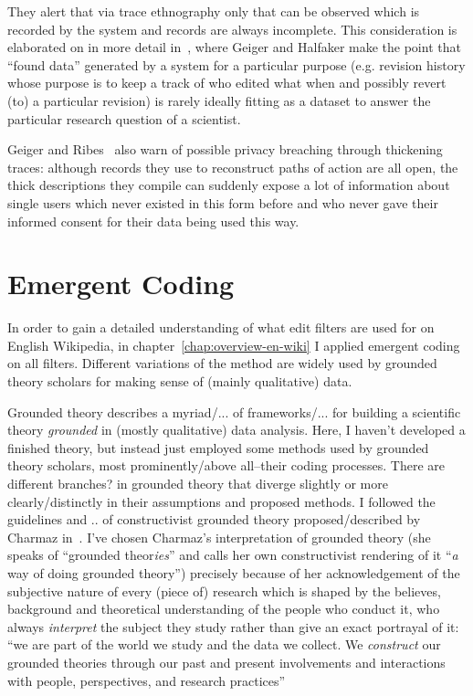 They alert that via trace ethnography only that can be observed which is recorded by the system and records are always incomplete.
This consideration is elaborated on in more detail in~\cite{GeiHal2017}, where Geiger and Halfaker make the point that ``found data'' generated by a system for a particular purpose (e.g. revision history whose purpose is to keep a track of who edited what when and possibly revert (to) a particular revision) is rarely ideally fitting as a dataset to answer the particular research question of a scientist.

Geiger and Ribes~\cite{GeiRib2011} also warn of possible privacy breaching through thickening traces:
although records they use to reconstruct paths of action are all open, the thick descriptions they compile can suddenly expose a lot of information about single users which never existed in this form before and who never gave their informed consent for their data being used this way.


\section{Emergent Coding}
\label{sec:gt}

In order to gain a detailed understanding of what edit filters are used for on English Wikipedia, in chapter~\ref{chap:overview-en-wiki} I applied emergent coding on all filters.
Different variations of the method are widely used by grounded theory scholars for making sense of (mainly qualitative) data.

Grounded theory describes a myriad/... of frameworks/... for building a scientific theory \emph{grounded} in (mostly qualitative) data analysis.
Here, I haven't developed a finished theory,
but instead just employed some methods used by grounded theory
scholars, most prominently/above all–their coding processes.
There are different branches? in grounded theory that diverge slightly or more clearly/distinctly in their assumptions and proposed methods.
I followed the guidelines and .. of constructivist grounded theory proposed/described by Charmaz in~\cite{Charmaz2006}.
I've chosen Charmaz's interpretation of grounded theory (she speaks of ``grounded theor\emph{ies}'' and calls her own constructivist rendering of it ``\emph{a} way of doing grounded theory'') precisely because of her acknowledgement of the subjective nature of every (piece of) research which is shaped by the believes, background and theoretical understanding of the people who conduct it, who always \emph{interpret} the subject they study rather than give an exact portrayal of it:
``we are part of the world we study and the data we collect. We \textit{construct} our grounded theories through our past and present involvements and interactions with people, perspectives, and research practices''~\cite[p.10]{Charmaz2006}

